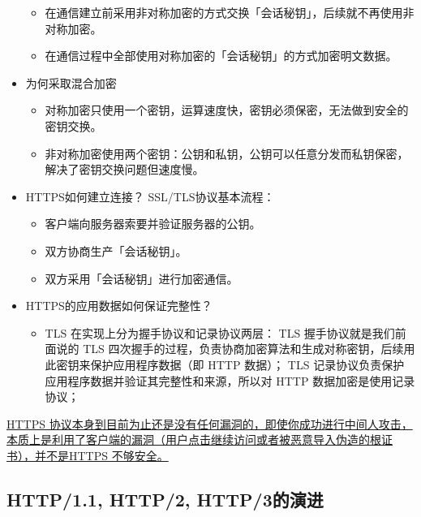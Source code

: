 \documentclass[11pt]{article}
\begin{document}
\begin{itemize}
\begin{itemize}
\item 在通信建立前采用非对称加密的方式交换「会话秘钥」，后续就不再使用非对称加密。
\item 在通信过程中全部使用对称加密的「会话秘钥」的方式加密明文数据。
\end{itemize}
\item 为何采取混合加密
\begin{itemize}
\item 对称加密只使用一个密钥，运算速度快，密钥必须保密，无法做到安全的密钥交换。
\item 非对称加密使用两个密钥：公钥和私钥，公钥可以任意分发而私钥保密，解决了密钥交换问题但速度慢。
\end{itemize}
\item HTTPS如何建立连接？
SSL/TLS协议基本流程：
\begin{itemize}
\item 客户端向服务器索要并验证服务器的公钥。
\item 双方协商生产「会话秘钥」。
\item 双方采用「会话秘钥」进行加密通信。
\end{itemize}
\item HTTPS的应用数据如何保证完整性？
\begin{itemize}
\item TLS 在实现上分为握手协议和记录协议两层：
TLS 握手协议就是我们前面说的 TLS 四次握手的过程，负责协商加密算法和生成对称密钥，后续用此密钥来保护应用程序数据（即 HTTP 数据）；
TLS 记录协议负责保护应用程序数据并验证其完整性和来源，所以对 HTTP 数据加密是使用记录协议；
\end{itemize}
\end{itemize}
\uline{HTTPS 协议本身到目前为止还是没有任何漏洞的，即使你成功进行中间人攻击，本质上是利用了客户端的漏洞（用户点击继续访问或者被恶意导入伪造的根证书），并不是HTTPS 不够安全。}
\subsection{HTTP/1.1, HTTP/2, HTTP/3的演进}
\label{sec:org3c7e394}
\end{document}
